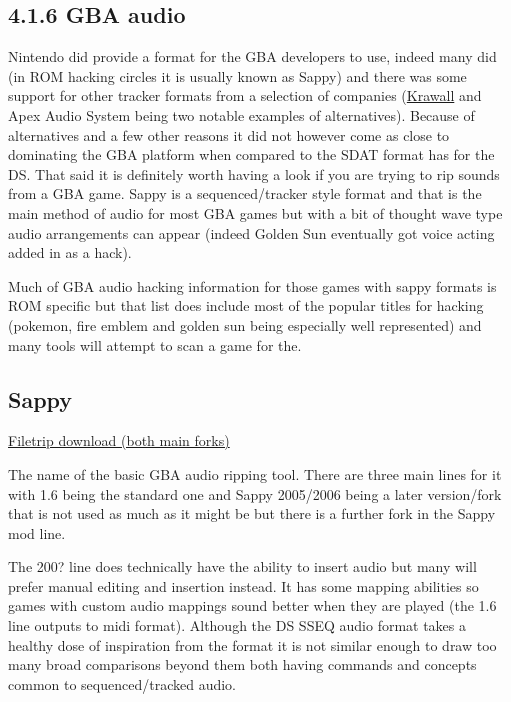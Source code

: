 \documentclass[
]{book}
\begin{document}
\hypertarget{gba-audio}{%
\subsection{4.1.6 GBA audio}\label{gba-audio}}

Nintendo did provide a format for the GBA developers to use, indeed many did (in ROM hacking circles it is usually known as Sappy) and there was some support for other tracker formats from a selection of companies (\href{http://knzl.de/krawall/}{Krawall} and Apex Audio System being two notable examples of alternatives). Because of alternatives and a few other reasons it did not however come as close to dominating the GBA platform when compared to the SDAT format has for the DS. That said it is definitely worth having a look if you are trying to rip sounds from a GBA game. Sappy is a sequenced/tracker style format and that is the main method of audio for most GBA games but with a bit of thought wave type audio arrangements can appear (indeed Golden Sun eventually got voice acting added in as a hack).

Much of GBA audio hacking information for those games with sappy formats is ROM specific but that list does include most of the popular titles for hacking (pokemon, fire emblem and golden sun being especially well represented) and many tools will attempt to scan a game for the.

\hypertarget{sappy}{%
\subsection{Sappy}\label{sappy}}

\href{http://filetrip.net/gba-downloads/tools-utilities/download-sappy-2006-f9566.html}{Filetrip download (both main forks)}

The name of the basic GBA audio ripping tool. There are three main lines for it with 1.6 being the standard one and Sappy 2005/2006 being a later version/fork that is not used as much as it might be but there is a further fork in the Sappy mod line.

The 200? line does technically have the ability to insert audio but many will prefer manual editing and insertion instead. It has some mapping abilities so games with custom audio mappings sound better when they are played (the 1.6 line outputs to midi format). Although the DS SSEQ audio format takes a healthy dose of inspiration from the format it is not similar enough to draw too many broad comparisons beyond them both having commands and concepts common to sequenced/tracked audio.
\end{document}
